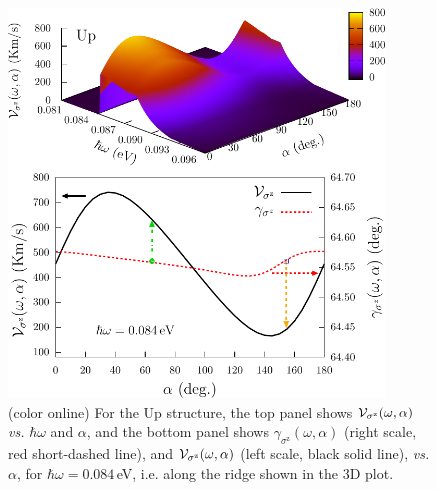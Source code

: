 \documentclass[floatfix,prb,aps,superscriptaddress,showpacs,11pt,preprint,letterpaper]{revtex4}
\def\tama{10cm}
\begin{document}
\begin{figure}[t]
\centering
\includegraphics[width=\tama]{fig4}
\caption{(color online) For the Up structure, the top panel
shows ${\cal V}_{\sigma^\mathrm{z}}(\omega,\alpha)$ {\it vs.} $\hbar\omega$ and
$\alpha$, and the bottom panel shows
$\gamma_{\sigma^\mathrm{z}}(\omega,\alpha)$ (right scale, red short-dashed line), and ${\cal
V}_{\sigma^\mathrm{z}}(\omega,\alpha)$ (left scale, black solid line), {\it
vs.} $\alpha$, for $\hbar\omega=0.084$\,eV, i.e. along the ridge shown in the
3D plot. }
\label{fig:up-vsz-w1}
\end{figure}
\end{document}
